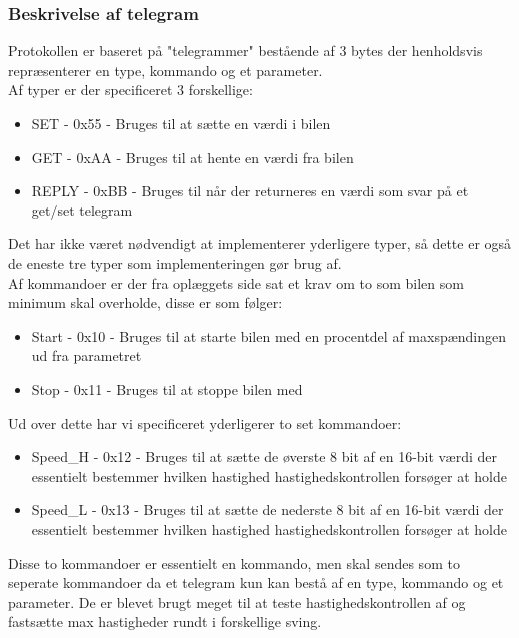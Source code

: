 \subsubsection{Beskrivelse af telegram}
Protokollen er baseret på "telegrammer" bestående af 3 bytes der henholdsvis repræsenterer en type, kommando og et parameter.\\
Af typer er der specificeret 3 forskellige:
\begin{itemize}
	\item SET - 0x55 - Bruges til at sætte en værdi i bilen
	\item GET - 0xAA - Bruges til at hente en værdi fra bilen
	\item REPLY - 0xBB - Bruges til når der returneres en værdi som svar på et get/set telegram
\end{itemize}
Det har ikke været nødvendigt at implementerer yderligere typer, så dette er også de eneste tre typer som implementeringen gør brug af.\\
Af kommandoer er der fra oplæggets side sat et krav om to som bilen som minimum skal overholde, disse er som følger:
\begin{itemize}
	\item Start - 0x10 - Bruges til at starte bilen med en procentdel af maxspændingen ud 			fra parametret
	\item Stop - 0x11 - Bruges til at stoppe bilen med
\end{itemize}

Ud over dette har vi specificeret yderligerer to set kommandoer:
\begin{itemize}
	\item Speed\_H - 0x12 - Bruges til at sætte de øverste 8 bit af en 16-bit værdi der essentielt bestemmer hvilken hastighed hastighedskontrollen forsøger at holde
	\item Speed\_L - 0x13 - Bruges til at sætte de nederste 8 bit af en 16-bit værdi der essentielt bestemmer hvilken hastighed hastighedskontrollen forsøger at holde
\end{itemize}

Disse to kommandoer er essentielt en kommando, men skal sendes som to seperate kommandoer da et telegram kun kan bestå af en type, kommando og et parameter. De er blevet brugt meget til at teste hastighedskontrollen af og fastsætte max hastigheder rundt i forskellige sving.\\

